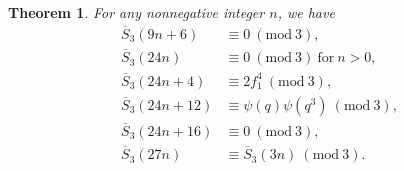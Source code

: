\documentclass[12pt]{amsart}
\theoremstyle{plain}
\newtheorem{theorem}{Theorem}[section]
\theoremstyle{definition}
\begin{document}
\begin{theorem} \label{thm1} For any nonnegative integer $n$, we have
\begin{align}
\overline{S}_{3}(9n+6) &\equiv0 \ (\mathrm{mod} \ 3), \label{thm1-cong11}\\
\overline{S}_{3}(24n) &\equiv  0 \ (\mathrm{mod} \ 3) \ \text{for} \ n>0, \label{thm1-cong1}\\
\overline{S}_{3}(24n+4) &\equiv  2 f_{1}^{4} \ (\mathrm{mod} \ 3), \label{thm1-cong2}\\
\overline{S}_{3}(24n+12) &\equiv  \psi(q) \psi(q^{3}) \ (\mathrm{mod} \ 3), \label{thm1-cong3}\\
\overline{S}_{3}(24n+16) &\equiv  0 \ (\mathrm{mod} \ 3), \label{thm1-cong4}\\
\overline{S}_{3}(27n) &\equiv  \overline{S}_{3}(3n) \ (\mathrm{mod} \ 3). \label{thm1-cong5}
\end{align}
\end{theorem}
\end{document}
